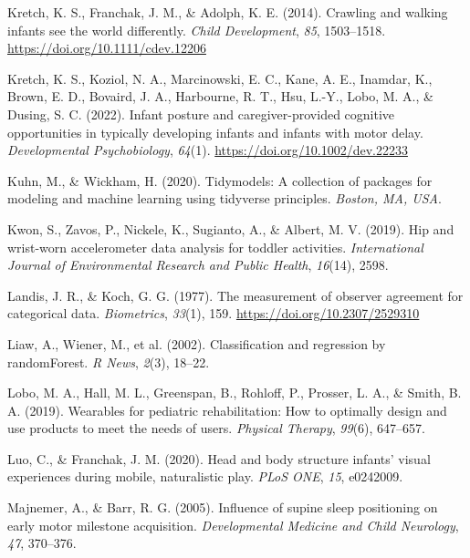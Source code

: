 \documentclass[
  man]{apa6}
\newlength{\cslhangindent}
\newlength{\cslentryspacingunit} %
\newenvironment{CSLReferences}[2] %
 {%
  \setlength{\parindent}{0pt}
  \ifodd #1
  \let\oldpar\par
  \def\par{\hangindent=\cslhangindent\oldpar}
  \fi
  \setlength{\parskip}{#2\cslentryspacingunit}
 }%
 {}
\begin{document}
\begin{CSLReferences}{1}{0}
\leavevmode{}%
Kretch, K. S., Franchak, J. M., \& Adolph, K. E. (2014). Crawling and walking infants see the world differently. \emph{Child Development}, \emph{85}, 1503--1518. \url{https://doi.org/10.1111/cdev.12206}

\leavevmode{}%
Kretch, K. S., Koziol, N. A., Marcinowski, E. C., Kane, A. E., Inamdar, K., Brown, E. D., Bovaird, J. A., Harbourne, R. T., Hsu, L.-Y., Lobo, M. A., \& Dusing, S. C. (2022). Infant posture and caregiver-provided cognitive opportunities in typically developing infants and infants with motor delay. \emph{Developmental Psychobiology}, \emph{64}(1). \url{https://doi.org/10.1002/dev.22233}

\leavevmode{}%
Kuhn, M., \& Wickham, H. (2020). Tidymodels: A collection of packages for modeling and machine learning using tidyverse principles. \emph{Boston, MA, USA}.

\leavevmode{}%
Kwon, S., Zavos, P., Nickele, K., Sugianto, A., \& Albert, M. V. (2019). Hip and wrist-worn accelerometer data analysis for toddler activities. \emph{International Journal of Environmental Research and Public Health}, \emph{16}(14), 2598.

\leavevmode{}%
Landis, J. R., \& Koch, G. G. (1977). The measurement of observer agreement for categorical data. \emph{Biometrics}, \emph{33}(1), 159. \url{https://doi.org/10.2307/2529310}

\leavevmode{}%
Liaw, A., Wiener, M., et al. (2002). Classification and regression by randomForest. \emph{R News}, \emph{2}(3), 18--22.

\leavevmode{}%
Lobo, M. A., Hall, M. L., Greenspan, B., Rohloff, P., Prosser, L. A., \& Smith, B. A. (2019). Wearables for pediatric rehabilitation: How to optimally design and use products to meet the needs of users. \emph{Physical Therapy}, \emph{99}(6), 647--657.

\leavevmode{}%
Luo, C., \& Franchak, J. M. (2020). Head and body structure infants' visual experiences during mobile, naturalistic play. \emph{{PLoS ONE}}, \emph{15}, e0242009.

\leavevmode{}%
Majnemer, A., \& Barr, R. G. (2005). Influence of supine sleep positioning on early motor milestone acquisition. \emph{Developmental Medicine and Child Neurology}, \emph{47}, 370--376.


\end{CSLReferences}
\end{document}
